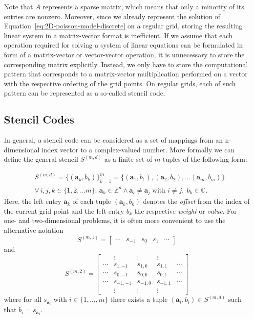 Note that $A$ represents a sparse matrix, which means that only a minority of its entries are nonzero.
Moreover, since we already represent the solution of Equation~\ref{eq:2D-poisson-model-discrete} on a regular grid, storing the resulting linear system in a matrix-vector format is inefficient.
If we assume that each operation required for solving a system of linear equations can be formulated in form of a matrix-vector or vector-vector operation, it is unnecessary to store the corresponding matrix explicitly.
Instead, we only have to store the computational pattern that corresponds to a matrix-vector multiplication performed on a vector with the respective ordering of the grid points.
On regular grids, each of such pattern can be represented as a so-called stencil code.
\subsection{Stencil Codes}
\label{subsec:stencil-codes}
In general, a stencil code can be considered as a set of mappings from an n-dimensional index vector to a complex-valued number.
More formally we can define the general stencil $S^{(m,d)}$ as a finite set of $m$ tuples of the following form:

\begin{equation}
	\begin{split}
			& S^{(m, d)} = \{(\bm{a}_k, b_k) \}_{k=1}^m = \{(\bm{a}_1, b_1),  (\bm{a}_2, b_2), \dots (\bm{a}_m, b_m)\} 
	\\ & \forall \, i, j, k \in \{1, 2, \dots m \}: \,
	\bm{a}_k \in \mathbb{Z}^d \wedge \bm{a}_i \neq \bm{a}_j \; \text{with} \; i \neq j, \; b_k \in \mathbb{C}.
	\end{split}
\end{equation}
Here, the left entry $\bm{a}_k$ of each tuple $(\bm{a}_k, b_k)$ denotes the \emph{offset} from the index of the current grid point and the left entry $b_k$ the respective \emph{weight} or \emph{value}.
For one- and two-dimensional problems, it is often more convenient to use the alternative notation 
\begin{equation*}
	S^{(m, 1)} = \begin{bmatrix}
		\cdots & s_{-1} & s_{0} & s_{1} & \cdots
	\end{bmatrix}
\end{equation*}
and
\begin{equation*}
	S^{(m, 2)} = \begin{bmatrix}
		& \vdots & \vdots & \vdots & \\
		\cdots & s_{1,-1} & s_{1,0} & s_{1,1} & \cdots \\
		\cdots & s_{0,-1} & s_{0,0} & s_{0,1} & \cdots \\
		\cdots & s_{-1,-1} & s_{-1,0} & s_{-1,1} & \cdots \\
		& \vdots & \vdots & \vdots &
	\end{bmatrix}
\end{equation*}
where for all $s_{\bm{a}_i}$  with $i \in \{1, \dots, m\}$ there exists a tuple $(\bm{a}_i, b_i) \in S^{(m, d)}$ such that $b_i = s_{\bm{a}_i}$.


